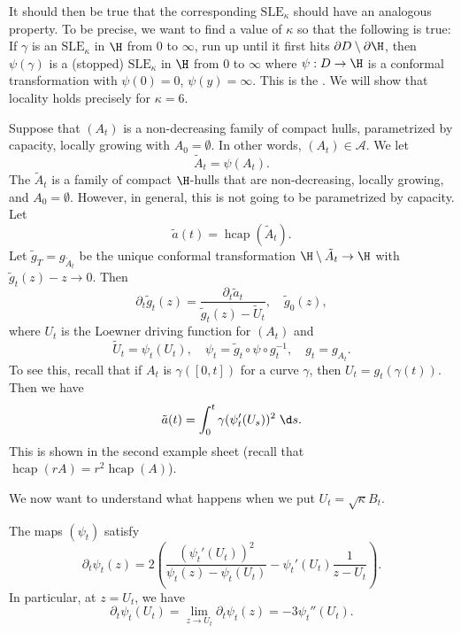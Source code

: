 \documentclass[a4paper]{article}
\DeclareMathOperator\hcap{hcap}
\newcommand\SLE{\mathrm{SLE}}
\begin{document}
It should then be true that the corresponding $\SLE_\kappa$ should have an analogous property. To be precise, we want to find a value of $\kappa$ so that the following is true: If $\gamma$ is an $\SLE_\kappa$ in $\H$ from $0$ to $\infty$, run up until it first hits $\partial D \setminus \partial \H$, then $\psi(\gamma)$ is a (stopped) $\SLE_\kappa$ in $\H$ from $0$ to $\infty$ where $\psi: D \to \H$ is a conformal transformation with $\psi(0) = 0$, $\psi(y) = \infty$. This is the . We will show that locality holds precisely for $\kappa = 6$.

Suppose that $(A_t)$ is a non-decreasing family of compact hulls, parametrized by capacity, locally growing with $A_0 = \emptyset$. In other words, $(A_t) \in \mathcal{A}$. We let
\[
  \tilde{A}_t = \psi(A_t).
\]
The $\tilde{A}_t$ is a family of compact $\H$-hulls that are non-decreasing, locally growing, and $A_0 = \emptyset$. However, in general, this is not going to be parametrized by capacity. Let
\[
  \tilde{a}(t) = \hcap(\tilde{A}_t).
\]
Let $\tilde{g}_T = g_{\tilde{A}_t}$ be the unique conformal transformation $\H \setminus \tilde{A}_t \to \H$ with $\tilde{g}_t(z) - z \to 0$. Then
\[
  \partial_t \tilde{g}_t (z) = \frac{\partial_t \tilde{a}_t}{\tilde{g}_t(z) - \tilde{U}_t},\quad \tilde{g}_0(z),
\]
where $U_t$ is the Loewner driving function for $(A_t)$ and
\[
  \tilde{U}_t = \psi_t(U_t),\quad \psi_t = \tilde{g}_t \circ \psi \circ g_t^{-1},\quad g_t = g_{A_t}.
\]
To see this, recall that if $A_t$ is $\gamma([0, t])$ for a curve $\gamma$, then $U_t = g_t(\gamma(t))$. Then we have
\[
  \tilde{a}(t) = \int_0^t \gamma(\psi_t'(U_s))^2\;\d s.
\]
This is shown in the second example sheet (recall that $\hcap(rA) = r^2 \hcap(A)$). 

We now want to understand what happens when we put $U_t = \sqrt{\kappa} B_t$.
\begin{prop}
  The maps $(\psi_t)$ satisfy
  \[
    \partial_t \psi_t(z) = 2 \left(\frac{(\psi_t'(U_t))^2}{\psi_t(z) - \psi_t(U_t)} - \psi_t' (U_t) \frac{1}{z - U_t}\right).
  \]
  In particular, at $z = U_t$, we have
  \[
    \partial_t \psi_t(U_t) = \lim_{z \to U_t} \partial_t \psi_t (z) = -3 \psi_t''(U_t).
  \]
\end{prop}



\printindex
\end{document}
